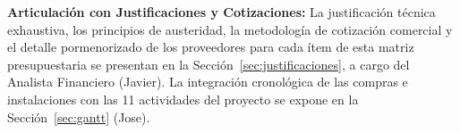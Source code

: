 \par\noindent\textbf{Articulación con Justificaciones y Cotizaciones:} La justificación técnica exhaustiva, los principios de austeridad, la metodología de cotización comercial y el detalle pormenorizado de los proveedores para cada ítem de esta matriz presupuestaria se presentan en la Sección~\ref{sec:justificaciones}, a cargo del Analista Financiero (Javier). La integración cronológica de las compras e instalaciones con las 11 actividades del proyecto se expone en la Sección~\ref{sec:gantt} (Jose).